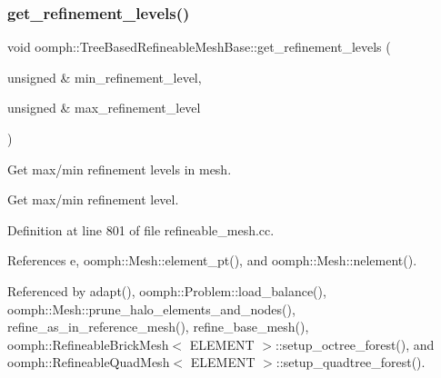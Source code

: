 \mbox{\label{classoomph_1_1TreeBasedRefineableMeshBase_a937e4321288b6642d5057498f7659d76}} 
\subsubsection{\texorpdfstring{get\+\_\+refinement\+\_\+levels()}{get\_refinement\_levels()}}
{\footnotesize\ttfamily void oomph\+::\+Tree\+Based\+Refineable\+Mesh\+Base\+::get\+\_\+refinement\+\_\+levels (\begin{DoxyParamCaption}\item[{unsigned \&}]{min\+\_\+refinement\+\_\+level,  }\item[{unsigned \&}]{max\+\_\+refinement\+\_\+level }\end{DoxyParamCaption})\hspace{0.3cm}{\ttfamily [virtual]}}



Get max/min refinement levels in mesh. 

Get max/min refinement level. 

Definition at line 801 of file refineable\+\_\+mesh.\+cc.



References e, oomph\+::\+Mesh\+::element\+\_\+pt(), and oomph\+::\+Mesh\+::nelement().



Referenced by adapt(), oomph\+::\+Problem\+::load\+\_\+balance(), oomph\+::\+Mesh\+::prune\+\_\+halo\+\_\+elements\+\_\+and\+\_\+nodes(), refine\+\_\+as\+\_\+in\+\_\+reference\+\_\+mesh(), refine\+\_\+base\+\_\+mesh(), oomph\+::\+Refineable\+Brick\+Mesh$<$ E\+L\+E\+M\+E\+N\+T $>$\+::setup\+\_\+octree\+\_\+forest(), and oomph\+::\+Refineable\+Quad\+Mesh$<$ E\+L\+E\+M\+E\+N\+T $>$\+::setup\+\_\+quadtree\+\_\+forest().

\mbox{\label{classoomph_1_1TreeBasedRefineableMeshBase_a6dba989c0d0735d8fe34ceb231425401}} 

